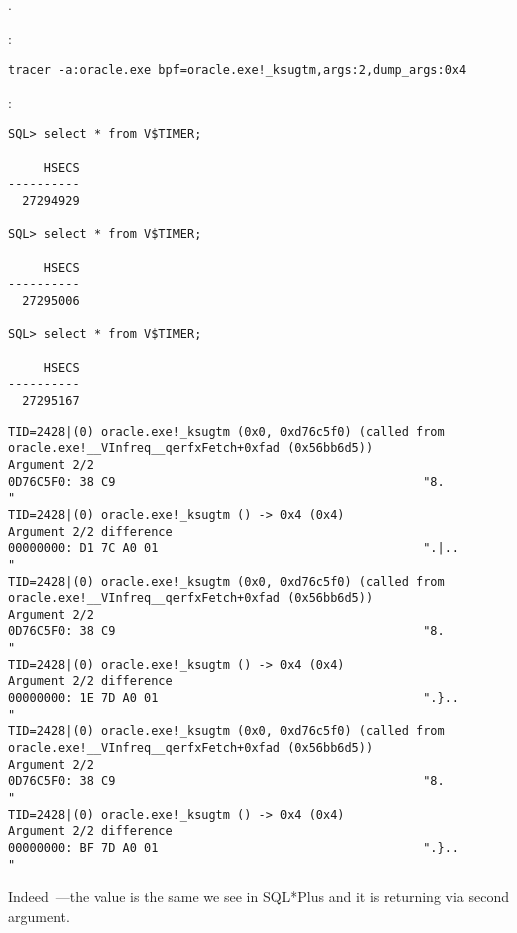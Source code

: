 .

:

\begin{lstlisting}
tracer -a:oracle.exe bpf=oracle.exe!_ksugtm,args:2,dump_args:0x4
\end{lstlisting}

:

\begin{lstlisting}
SQL> select * from V$TIMER;

     HSECS
----------
  27294929

SQL> select * from V$TIMER;

     HSECS
----------
  27295006

SQL> select * from V$TIMER;

     HSECS
----------
  27295167
\end{lstlisting}

\begin{lstlisting}[caption=\IFRU{вывод \tracer}{\tracer output}]
TID=2428|(0) oracle.exe!_ksugtm (0x0, 0xd76c5f0) (called from oracle.exe!__VInfreq__qerfxFetch+0xfad (0x56bb6d5))
Argument 2/2
0D76C5F0: 38 C9                                           "8.              "
TID=2428|(0) oracle.exe!_ksugtm () -> 0x4 (0x4)
Argument 2/2 difference
00000000: D1 7C A0 01                                     ".|..            "
TID=2428|(0) oracle.exe!_ksugtm (0x0, 0xd76c5f0) (called from oracle.exe!__VInfreq__qerfxFetch+0xfad (0x56bb6d5))
Argument 2/2
0D76C5F0: 38 C9                                           "8.              "
TID=2428|(0) oracle.exe!_ksugtm () -> 0x4 (0x4)
Argument 2/2 difference
00000000: 1E 7D A0 01                                     ".}..            "
TID=2428|(0) oracle.exe!_ksugtm (0x0, 0xd76c5f0) (called from oracle.exe!__VInfreq__qerfxFetch+0xfad (0x56bb6d5))
Argument 2/2
0D76C5F0: 38 C9                                           "8.              "
TID=2428|(0) oracle.exe!_ksugtm () -> 0x4 (0x4)
Argument 2/2 difference
00000000: BF 7D A0 01                                     ".}..            "
\end{lstlisting}

{Indeed~---the value is the same we see in SQL*Plus and it is returning via second argument}.

